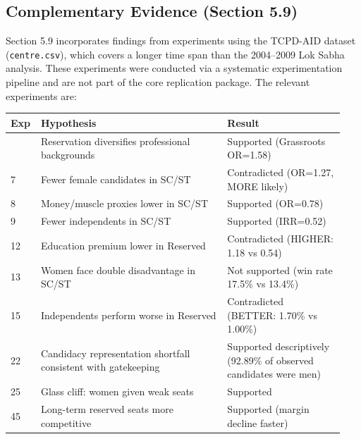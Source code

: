 \documentclass[
]{article}
\newcounter{none} %
\begin{document}
\subsection{Complementary Evidence (Section 5.9)}\label{complementary-evidence-section-59}

Section 5.9 incorporates findings from experiments using the TCPD-AID dataset (\texttt{centre.csv}), which covers a longer time span than the 2004--2009 Lok Sabha analysis. These experiments were conducted via a systematic experimentation pipeline and are not part of the core replication package. The relevant experiments are:

{\def\LTcaptype{none} %
\begin{longtable}[]{@{}p{0.06\linewidth}p{0.54\linewidth}p{0.34\linewidth}@{}}
\toprule\noalign{}
Exp & Hypothesis & Result \\
\midrule\noalign{}
\endhead
\bottomrule\noalign{}
\endlastfoot
1 & Reservation diversifies professional backgrounds & Supported (Grassroots OR=1.58) \\
7 & Fewer female candidates in SC/ST & Contradicted (OR=1.27, MORE likely) \\
8 & Money/muscle proxies lower in SC/ST & Supported (OR=0.78) \\
9 & Fewer independents in SC/ST & Supported (IRR=0.52) \\
12 & Education premium lower in Reserved & Contradicted (HIGHER: 1.18 vs 0.54) \\
13 & Women face double disadvantage in SC/ST & Not supported (win rate 17.5\% vs 13.4\%) \\
15 & Independents perform worse in Reserved & Contradicted (BETTER: 1.70\% vs 1.00\%) \\
22 & Candidacy representation shortfall consistent with gatekeeping & Supported descriptively (92.89\% of observed candidates were men) \\
25 & Glass cliff: women given weak seats & Supported \\
45 & Long-term reserved seats more competitive & Supported (margin decline faster) \\
\end{longtable}
}
\end{document}
